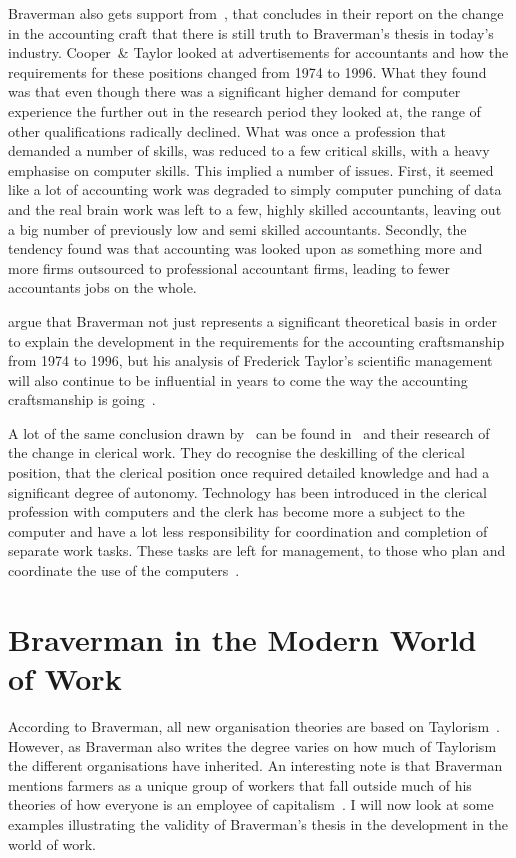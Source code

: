 \documentclass[a4paper,12pt,titlepage]{article}
\begin{document}
  Braverman also gets support from~\cite{ccpt}, that concludes in their
  report on the change in the accounting craft that there is still
  truth to Braverman's thesis in today's industry.
  Cooper~\& Taylor looked at advertisements for accountants and
  how the requirements for these positions changed from 1974 to 1996.
  What they found was that even though there was a significant higher
  demand for computer experience the further out in the research period
  they looked at, the range of other qualifications radically declined.
  What was once a profession that demanded a number of skills, was
  reduced to a few critical skills, with a heavy emphasise on computer
  skills. This implied a number of issues. First, it seemed like
  a lot of accounting work was degraded to simply computer
  punching of data and the real brain work was left to a few, highly
  skilled accountants, leaving out a big number of previously
  low and semi skilled accountants. Secondly, the tendency found
  was that accounting was looked upon as something more and more
  firms outsourced to professional accountant firms, leading to
  fewer accountants jobs on the whole.

  \cite{ccpt} argue that
  Braverman not just represents a significant theoretical basis in order to
  explain the development in the requirements for the accounting
  craftsmanship from 1974 to 1996, but his analysis of Frederick Taylor's
  scientific management will also continue to be influential in years to come
  the way the accounting craftsmanship is going~\cite[575]{ccpt}.

  A lot of the same conclusion drawn by~\cite{ccpt} can be found
  in~\cite{rcsr} and their research of the change in clerical work.
  They do recognise the deskilling of the clerical position, that
  the clerical position once required detailed knowledge and had
  a significant degree of autonomy. Technology has been introduced
  in the clerical profession with computers and the clerk has become
  more a subject to the computer and have a lot less
  responsibility for coordination and completion of separate work tasks.
  These tasks are left for management, to those who plan 
  and coordinate the use of the computers~\cite[175-78]{rcsr}.
  
  \section{Braverman in the Modern World of Work}
  According to Braverman, all new organisation theories are
  based on Taylorism~\cite[87]{hb}. However, as Braverman also writes
  the degree varies on how much of Taylorism the different organisations
  have inherited. An interesting note is that Braverman mentions
  farmers as a unique group of workers
  that fall outside much of his theories of how everyone is an employee
  of capitalism~\cite[109]{hb}. I will now look at some examples
  illustrating the validity of Braverman's thesis in
  the development in the world of work. 
\end{document}
